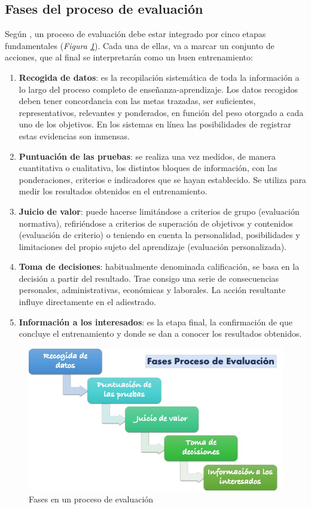 \subsection{Fases del proceso de evaluación}
Según \cite{Aretio2020}, un proceso de evaluación debe estar integrado por cinco etapas fundamentales (\textsl{Figura \ref{fig:fases-evaluacion}}). Cada una de ellas, va a marcar un conjunto de acciones, que al final se interpretarán como un buen entrenamiento:

\begin{enumerate}
\item \textbf{Recogida de datos}: es la recopilación sistemática de toda la información a lo largo del proceso completo de enseñanza-aprendizaje. Los datos recogidos deben tener concordancia con las metas trazadas, ser suficientes, representativos, relevantes y ponderados, en función del peso otorgado a cada uno de los objetivos. En los sistemas en línea las posibilidades de registrar estas evidencias son inmensas.
\item \textbf{Puntuación de las pruebas}: se realiza una vez medidos, de manera cuantitativa o cualitativa, los distintos bloques de información, con las ponderaciones, criterios e indicadores que se hayan establecido. Se utiliza para medir los resultados obtenidos en el entrenamiento.
\item \textbf{Juicio de valor}: puede hacerse limitándose a criterios de grupo (evaluación normativa), refiriéndose a criterios de superación de objetivos y contenidos (evaluación de criterio) o teniendo en cuenta la personalidad, posibilidades y limitaciones del propio sujeto del aprendizaje (evaluación personalizada).
\item \textbf{Toma de decisiones}: habitualmente denominada calificación, se basa en la decisión a partir del resultado. Trae consigo una serie de consecuencias personales, administrativas, económicas y laborales. La acción resultante influye directamente en el adiestrado.
\item \textbf{Información a los interesados}: es la etapa final, la confirmación de que concluye el entrenamiento y donde se dan a conocer los resultados obtenidos.
\end{enumerate}

\begin{figure}[h]
\centering
 \includegraphics[width=0.6\linewidth]{imagen/fases-proceso-evaluacion.jpg}
 \caption{Fases en un proceso de evaluación}
 \label{fig:fases-evaluacion} 
\end{figure}

